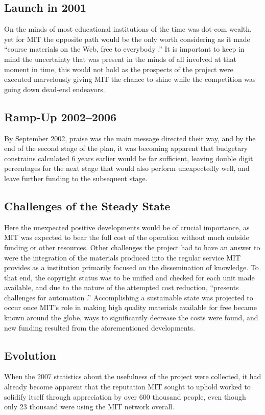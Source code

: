 \documentclass[a4paper]{article}
\begin{document}
\subsection{Launch in 2001} 
On the minds of most educational institutions of the time was dot-com wealth, yet for MIT the opposite path would be the only worth considering as it made ``course materials on the Web, free to everybody \cite{OCW}.'' It is important to keep in mind the uncertainty that was present in the minds of all involved at that moment in time, this would not hold as the prospects of the project were executed marvelously giving MIT the chance to shine while the competition was going down dead-end endeavors. 

\subsection{Ramp-Up 2002--2006} 
By September 2002, praise was the main message directed their way, and by the end of the second stage of the plan, it was becoming apparent that budgetary constrains calculated 6 years earlier would be far sufficient, leaving double digit percentages for the next stage that would also perform unexpectedly well, and leave further funding to the subsequent stage. 

\subsection{Challenges of the Steady State} 
Here the unexpected positive developments would be of crucial importance, as MIT was expected to bear the full cost of the operation without much outside funding or other resources. Other challenges the project had to have an answer to were the integration of the materials produced into the regular service MIT provides as a institution primarily focused on the dissemination of knowledge. To that end, the copyright status was to be unified and checked for each unit made available, and due to the nature of the attempted cost reduction, ``presents challenges for automation \cite{OCW}.'' 
Accomplishing a sustainable state was projected to occur once MIT's role in making high quality materials available for free became known around the globe, ways to significantly decrease the costs were found, and new funding resulted from the aforementioned developments. 

\subsection{Evolution} 
When the 2007 statistics about the usefulness of the project were collected, it had already become apparent that the reputation MIT sought to uphold worked to solidify itself through appreciation by over 600 thousand people, even though only 23 thousand were using the MIT network overall.\\
\end{document}
